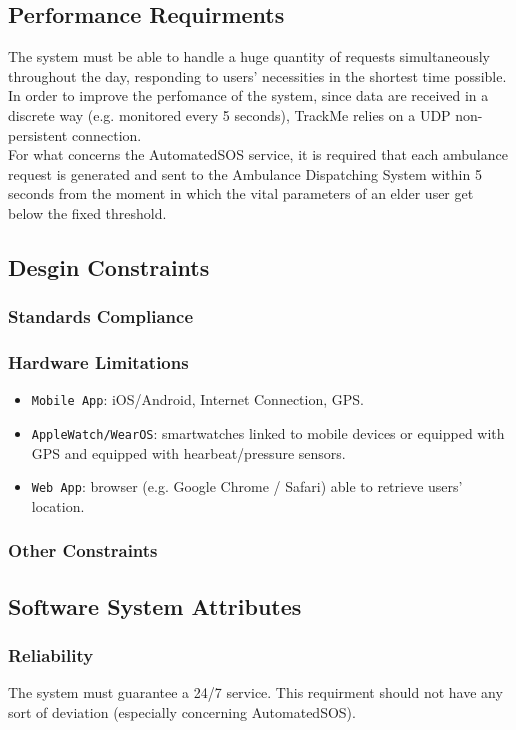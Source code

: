 \documentclass[12pt,a4paper]{article}
\begin{document}
	
	
	
	
	\subsection{Performance Requirments}
	The system must be able to handle a huge quantity of requests simultaneously throughout the day, responding to users' necessities in the shortest time possible. In order to improve the perfomance of the system, since data are received in a discrete way (e.g. monitored every 5 seconds), TrackMe relies on a UDP non-persistent connection.\\
	For what concerns the AutomatedSOS service, it is required that each ambulance request is generated and sent to the Ambulance Dispatching System within 5 seconds from the moment in which the vital parameters of an elder user get below the fixed threshold.
	
	\subsection{Desgin Constraints}
	\subsubsection{Standards Compliance}
	\subsubsection{Hardware Limitations}
		\begin{itemize}
			\item \texttt{Mobile App}: iOS/Android, Internet Connection, GPS.
			\item \texttt{AppleWatch/WearOS}: smartwatches linked to mobile devices or equipped with GPS and equipped with hearbeat/pressure sensors.
			\item \texttt{Web App}: browser (e.g. Google Chrome / Safari) able to retrieve users' location.
		\end{itemize}
	\subsubsection{Other Constraints}
	
	\subsection{Software System Attributes}
	\subsubsection{Reliability}
	The system must guarantee a 24/7 service. This requirment should not have any sort of deviation (especially concerning AutomatedSOS).
\end{document}
